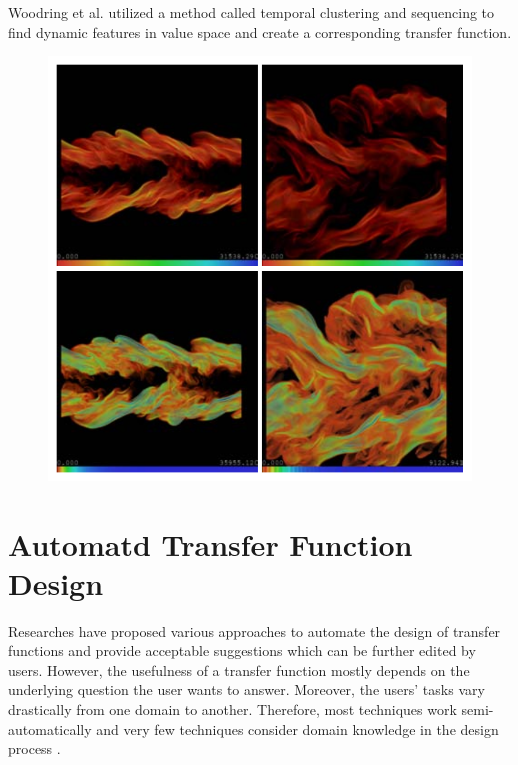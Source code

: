 Woodring et al. \cite{woodring_semi-automatic_2009} utilized a method called temporal clustering and sequencing to find dynamic features in value space and create a corresponding transfer function.

\begin{figure}
\centering
\includegraphics[width=1\linewidth]{images/woodring_semi-automatic_2009}
\caption{\cite{woodring_semi-automatic_2009}}
\label{fig:woodring_semi-automatic_2009}
\end{figure}


\cite{wang_importance-driven_2008}

\cite{ward_visual_2011}

\cite{jang_time-varying_2012}

\section{Automatd Transfer Function Design}
Researches have proposed various approaches to automate the design of transfer functions and provide acceptable suggestions which can be further edited by users. However, the usefulness of a transfer function mostly depends on the underlying question the user wants to answer. Moreover, the users' tasks vary drastically from one domain to another. Therefore, most techniques work semi-automatically and very few techniques consider domain knowledge in the design process \cite{zudilova-seinstra_trends_2008}.

